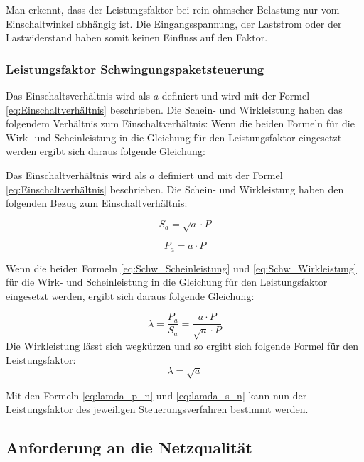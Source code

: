 Man erkennt, dass der Leistungsfaktor bei rein ohmscher Belastung nur vom Einschaltwinkel abhängig ist. Die Eingangsspannung, der Laststrom oder der Lastwiderstand haben somit keinen Einfluss auf den Faktor.



\newpage
\subsubsection{Leistungsfaktor Schwingungspaketsteuerung}
Das Einschaltsverhältnis wird als $a$ definiert und wird mit der Formel \ref{eq:Einschaltverhältnis} beschrieben.
Die Schein- und Wirkleistung haben das folgendem Verhältnis zum Einschaltverhältnis: \cite{Leistungselektronik}
Wenn die beiden Formeln für die Wirk- und Scheinleistung in die Gleichung für den Leistungsfaktor eingesetzt werden ergibt sich daraus folgende Gleichung: 

Das Einschaltverhältnis wird als $a$ definiert und mit der Formel \ref{eq:Einschaltverhältnis} beschrieben.
Die Schein- und Wirkleistung haben den folgenden Bezug zum Einschaltverhältnis:

\begin{equation}\label{eq:Schw_Scheinleistung}
S_a = \sqrt{a} \cdot P 
\end{equation}

\begin{equation}\label{eq:Schw_Wirkleistung}
P_a = a \cdot P 
\end{equation}

Wenn die beiden Formeln \ref{eq:Schw_Scheinleistung} und \ref{eq:Schw_Wirkleistung} für die Wirk- und Scheinleistung in die Gleichung für den Leistungsfaktor eingesetzt werden, ergibt sich daraus folgende Gleichung: 

\begin{equation}
\lambda = \frac{P_a }{S_a} = \frac{a \cdot P}{\sqrt{a} \cdot P}
\end{equation}
Die Wirkleistung lässt sich wegkürzen und so ergibt sich folgende Formel für den Leistungsfaktor:
\begin{equation}\label{eq:lamda_s_n}
\lambda = \sqrt{a}
\end{equation}

Mit den Formeln \ref{eq:lamda_p_n} und \ref{eq:lamda_s_n} kann nun der Leistungsfaktor des jeweiligen Steuerungsverfahren bestimmt werden.   



\subsection{Anforderung an die Netzqualität}

